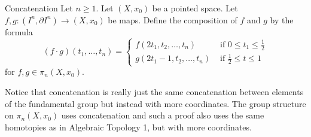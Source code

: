 \documentclass[a4paper]{article}
\begin{document}
\begin{defn}{Concatenation}{} Let $n\geq 1$. Let $(X,x_0)$ be a pointed space. Let $f,g:(I^n,\partial I^n)\to(X,x_0)$ be maps. Define the composition of $f$ and $g$ by the formula $$(f\cdot g)(t_1,\dots,t_n)=\begin{cases}
f(2t_1,t_2,\dots,t_n) & \text{ if } 0\leq t_1\leq\frac{1}{2}\\
g(2t_1-1,t_2,\dots,t_n) & \text{ if } \frac{1}{2}\leq t\leq 1
\end{cases}$$ for $f,g\in\pi_n(X,x_0)$. 
\end{defn}

Notice that concatenation is really just the same concatenation between elements of the fundamental group but instead with more coordinates. The group structure on $\pi_n(X,x_0)$ uses concatenation and such a proof also uses the same homotopies as in Algebraic Topology 1, but with more coordinates. 
\end{document}
